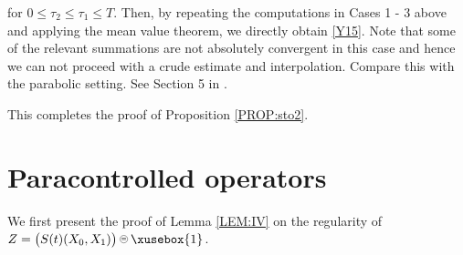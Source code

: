 \documentclass[%
11pt,  reqno]{amsart}
\def\<#1>{\xusebox{#1}}
\newcommand{\pe}{\mathbin{\scaleobj{0.7}{\tikz \draw (0,0) node[shape=circle,draw,inner sep=0pt,minimum size=8.5pt] {\scriptsize  $=$};}}}
\newcommand{\1}{\hspace{0.2mm}\text{I}\hspace{0.2mm}}
\newcommand{\noi}{\noindent}
\numberwithin{equation}{section}
\numberwithin{theorem}{section}
\begin{document}
\noi
for $0 \leq \tau_2 \leq \tau_1 \leq T$.
Then, by repeating the computations in Cases 1 - 3 above
and applying the mean value theorem, 
we directly obtain \eqref{Y15}.
Note that some of the relevant summations are not absolutely convergent in this case
and hence we can not proceed with a crude estimate and 
interpolation.  Compare this with the parabolic setting.
See Section 5 in \cite{MWX}.

This completes the proof of Proposition \ref{PROP:sto2}.



\section{Paracontrolled operators}
\label{SEC:po}

We first present the proof of 
Lemma \ref{LEM:IV} on the regularity of $Z = \big(S(t) (X_0,   X_1)\big) \pe \<1> $.
\end{document}
